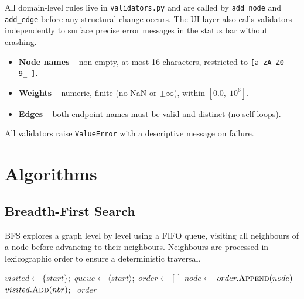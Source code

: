 \documentclass[12pt, a4paper]{article}
\begin{document}
All domain-level rules live in \texttt{validators.py} and are called by
\texttt{add\_node} and \texttt{add\_edge} before any structural change
occurs. The UI layer also calls validators independently to surface
precise error messages in the status bar without crashing.

\begin{itemize}
    \item \textbf{Node names} -- non-empty, at most 16 characters,
          restricted to \texttt{[a-zA-Z0-9\_-]}.
    \item \textbf{Weights} -- numeric, finite (no NaN or $\pm\infty$),
          within $[0.0,\; 10^6]$.
    \item \textbf{Edges} -- both endpoint names must be valid and
          distinct (no self-loops).
\end{itemize}

All validators raise \texttt{ValueError} with a descriptive message on
failure.

\section{Algorithms}
\label{sec:algorithms}

\subsection{Breadth-First Search}
\label{sec:bfs}

BFS explores a graph level by level using a FIFO queue, visiting all
neighbours of a node before advancing to their neighbours. Neighbours
are processed in lexicographic order to ensure a deterministic traversal.

\begin{algorithm}[H]
\caption{Breadth-First Search}
\begin{algorithmic}[1]
    \State $visited \gets \{start\}$;\ $queue \gets \langle start \rangle$;\ $order \gets []$
        \State $node \gets$ 
        \State $order.\textsc{Append}(node)$
                \State $visited.\textsc{Add}(nbr)$;\ 
            \EndIf
        \EndFor
    \EndWhile
    \Return $order$
\EndFunction
\end{algorithmic}
\end{algorithm}
\end{document}
